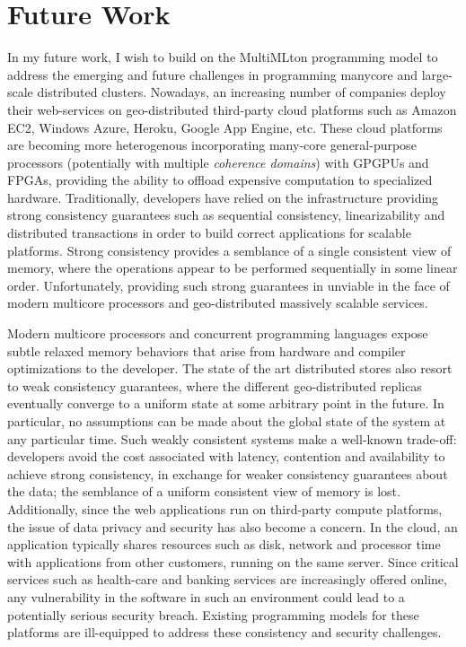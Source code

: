\documentclass{article}
\begin{document}
\section*{Future Work}

In my future work, I wish to build on the MultiMLton programming model to
address the emerging and future challenges in programming manycore and
large-scale distributed clusters. Nowadays, an increasing number of companies
deploy their web-services on geo-distributed third-party cloud platforms such
as Amazon EC2, Windows Azure, Heroku, Google App Engine, etc. These cloud
platforms are becoming more heterogenous incorporating many-core
general-purpose processors (potentially with multiple \emph{coherence domains})
with GPGPUs and FPGAs, providing the ability to offload expensive computation
to specialized hardware. Traditionally, developers have relied on the
infrastructure providing strong consistency guarantees such as sequential
consistency, linearizability and distributed transactions in order to build
correct applications for scalable platforms. Strong consistency provides a
semblance of a single consistent view of memory, where the operations appear to
be performed sequentially in some linear order. Unfortunately, providing such
strong guarantees in unviable in the face of modern multicore processors and
geo-distributed massively scalable services.

Modern multicore processors and concurrent programming languages expose subtle
relaxed memory behaviors that arise from hardware and compiler optimizations
to the developer. The state of the art distributed stores also resort to weak
consistency guarantees, where the different geo-distributed replicas eventually
converge to a uniform state at some arbitrary point in the future. In
particular, no assumptions can be made about the global state of the system at
any particular time. Such weakly consistent systems make a well-known
trade-off: developers avoid the cost associated with latency, contention and
availability to achieve strong consistency, in exchange for weaker consistency
guarantees about the data; the semblance of a uniform consistent view of memory
is lost. Additionally, since the web applications run on third-party compute
platforms, the issue of data privacy and security has also become a concern. In
the cloud, an application typically shares resources such as disk, network and
processor time with applications from other customers, running on the same
server. Since critical services such as health-care and banking services are
increasingly offered online, any vulnerability in the software in such an
environment could lead to a potentially serious security breach. Existing
programming models for these platforms are ill-equipped to address these
consistency and security challenges.
\end{document}
